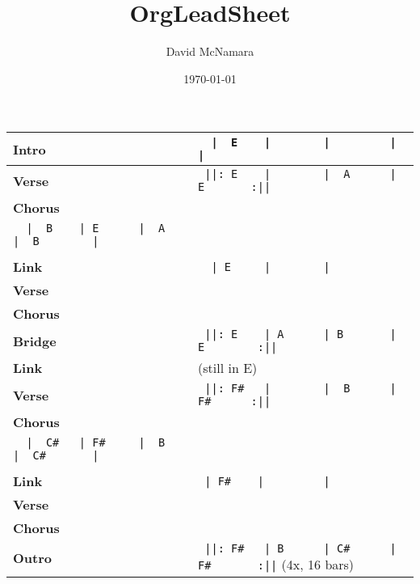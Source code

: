 \documentclass{LeadMemo}
\title{OrgLeadSheet}
\author{David McNamara}
\date{\today}
\begin{document}
\maketitle

\def\arraystretch{2.25}
\begin{tabular}[h]{ p{}  p{}  }
    \huge\textbf{Intro }         &\large\verb!  |  E    |        |         |           |!\\
    \hline
    \huge\textbf{Verse \vfill }  &\large\verb! ||: E    |        |  A      |  E       :||!\\
    \hline
    \huge\textbf{Chorus} &  \begin{minipage}[t]{\textwidth}
    \large\verb!  |  B    | E      |  B      |  E        |!\\ 
    \large\verb!  |  B    | E      |  A      |  B        |!\\
    \end{minipage}
    \\ 
    \hline
    \huge\textbf{Link}             &\large\verb!  | E     |        |!\\
    \hline
    \huge\textbf{Verse \vfill }  &  \\
    \hline
    \huge\textbf{Chorus \vfill }  &  \\
    \hline
    \huge\textbf{Bridge \vfill}  &\large\verb! ||: E    | A      | B       | E        :||!\\
    \hline
    \huge\textbf{Link\vfill }  &  (still in E) \\
    \hline
    \huge\textbf{Verse \vfill }  &\large\verb! ||: F#   |        |  B      |  F#      :||!\\
    \hline
    \huge\textbf{Chorus} &  \begin{minipage}[t]{\textwidth}
    \large\verb!  |  C#   | F#     |  C#     |  F#       |!\\ 
    \large\verb!  |  C#   | F#     |  B      |  C#       |!\\
    \end{minipage}
    \\ 
    \hline
    \huge\textbf{Link}             &\large\verb! | F#    |         |!\\
    \hline
    \huge\textbf{Verse} & \\
    \hline
    \huge\textbf{Chorus} & \\
    \hline
    \huge\textbf{Outro \vfill}  &\large\verb! ||: F#   | B      | C#      | F#       :||! (4x, 16 bars)\\
 \end{tabular}
\def\arraystretch{1.0}
\end{document}
